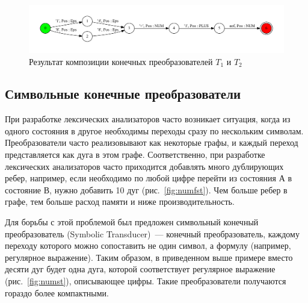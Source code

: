 \begin{figure}[h!]
        \includegraphics[width=\linewidth]{Gumin/pictures/res_.pdf}
        \caption{Результат композиции конечных преобразователей $T_1$ и $T_2$}
        \label{compose3} 
\end{figure}

\subsection{Символьные конечные преобразователи}
При разработке лексических анализаторов часто возникает ситуация, когда из одного состояния в другое необходимы переходы сразу по нескольким символам. Преобразователи часто реализовывают как некоторые графы, и каждый переход представляется как дуга в этом графе. Соответственно, при разработке лексических анализаторов часто приходится добавлять много дублирующих ребер, например, если необходимо по любой цифре перейти из состояния $А$ в состояние $В$, нужно добавить 10 дуг (рис.~\ref{fig:numfst}). Чем больше ребер в графе, тем больше расход памяти и ниже производительность.

Для борьбы с этой проблемой был предложен символьный конечный преобразователь (Symbolic Transducer)~--- конечный преобразователь,  каждому переходу которого можно сопоставить не один символ, а формулу (например, регулярное выражение). Таким образом, в приведенном выше примере вместо десяти дуг будет одна дуга, которой соответствует регулярное выражение (рис.~\ref{fig:numst}), описывающее цифры. Такие преобразователи получаются гораздо более компактными. 

